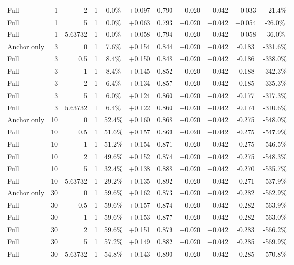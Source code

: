 \begin{table}[htbp]
\begin{tabular}{lrrrccccccc}
Full & 1 & 2 & 1 & 0.0\% & +0.097 & 0.790 & +0.020 & +0.042 & +0.033 & +21.4\% \\
Full & 1 & 5 & 1 & 0.0\% & +0.063 & 0.793 & +0.020 & +0.042 & +0.054 & -26.0\% \\
Full & 1 & 5.63732 & 1 & 0.0\% & +0.058 & 0.794 & +0.020 & +0.042 & +0.058 & -36.0\% \\
Anchor only & 3 & 0 & 1 & 7.6\% & +0.154 & 0.844 & +0.020 & +0.042 & -0.183 & -331.6\% \\
Full & 3 & 0.5 & 1 & 8.4\% & +0.150 & 0.848 & +0.020 & +0.042 & -0.186 & -338.0\% \\
Full & 3 & 1 & 1 & 8.4\% & +0.145 & 0.852 & +0.020 & +0.042 & -0.188 & -342.3\% \\
Full & 3 & 2 & 1 & 6.4\% & +0.134 & 0.857 & +0.020 & +0.042 & -0.185 & -335.3\% \\
Full & 3 & 5 & 1 & 6.0\% & +0.124 & 0.860 & +0.020 & +0.042 & -0.177 & -317.3\% \\
Full & 3 & 5.63732 & 1 & 6.4\% & +0.122 & 0.860 & +0.020 & +0.042 & -0.174 & -310.6\% \\
Anchor only & 10 & 0 & 1 & 52.4\% & +0.160 & 0.868 & +0.020 & +0.042 & -0.275 & -548.0\% \\
Full & 10 & 0.5 & 1 & 51.6\% & +0.157 & 0.869 & +0.020 & +0.042 & -0.275 & -547.9\% \\
Full & 10 & 1 & 1 & 51.2\% & +0.154 & 0.871 & +0.020 & +0.042 & -0.275 & -546.5\% \\
Full & 10 & 2 & 1 & 49.6\% & +0.152 & 0.874 & +0.020 & +0.042 & -0.275 & -548.3\% \\
Full & 10 & 5 & 1 & 32.4\% & +0.138 & 0.888 & +0.020 & +0.042 & -0.270 & -535.7\% \\
Full & 10 & 5.63732 & 1 & 29.2\% & +0.135 & 0.892 & +0.020 & +0.042 & -0.271 & -537.9\% \\
Anchor only & 30 & 0 & 1 & 59.6\% & +0.162 & 0.873 & +0.020 & +0.042 & -0.282 & -562.9\% \\
Full & 30 & 0.5 & 1 & 59.6\% & +0.157 & 0.874 & +0.020 & +0.042 & -0.282 & -563.9\% \\
Full & 30 & 1 & 1 & 59.6\% & +0.153 & 0.877 & +0.020 & +0.042 & -0.282 & -563.0\% \\
Full & 30 & 2 & 1 & 59.6\% & +0.151 & 0.879 & +0.020 & +0.042 & -0.283 & -566.2\% \\
Full & 30 & 5 & 1 & 57.2\% & +0.149 & 0.882 & +0.020 & +0.042 & -0.285 & -569.9\% \\
Full & 30 & 5.63732 & 1 & 54.8\% & +0.143 & 0.890 & +0.020 & +0.042 & -0.285 & -570.8\% \\

\end{tabular}
\end{table}
